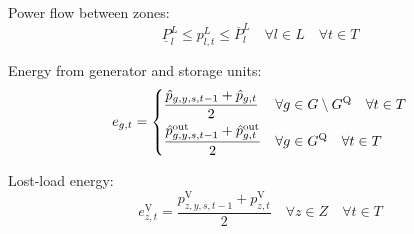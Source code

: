 \documentclass{article}
\newcommand{\sGenerators}{G}
\newcommand{\sGeneratorsExistingThermal}{G^{\mathrm{E,T}}}
\newcommand{\sGeneratorsCandidate}{G^{\mathrm{C}}}
\newcommand{\sGeneratorsThermal}{G^{\mathrm{T}}}
\newcommand{\sStorage}{G^{\mathrm{Q}}}
\newcommand{\sYears}{Y}
\newcommand{\sScenarios}{S}
\newcommand{\sIntervals}{T}
\newcommand{\sZones}{Z}
\newcommand{\sLinks}{L}
\newcommand{\iGenerator}{g}
\newcommand{\iYear}{y}
\newcommand{\iScenario}{s}
\newcommand{\iInterval}{t}
\newcommand{\iCalibrationInterval}{c}
\newcommand{\iZone}{z}
\newcommand{\iLink}{l}
\newcommand{\cScenarioDuration}[1][\iYear,\iScenario]{\rho_{#1}}
\newcommand{\cEmissionsIntensity}[1][\iGenerator]{E_{#1}}
\newcommand{\cPowerFlowMin}{\underline{P}_{\iLink}^{L}}
\newcommand{\cPowerFlowMax}{\overline{P}_{\iLink}^{L}}
\newcommand{\cEmmissionsCumulativeTarget}{\overline{E}}
\newcommand{\cSchemeRevenueCumulativeTarget}{\overline{R}}
\newcommand{\vBaseline}[1][\iCalibrationInterval]{\phi_{#1}}
\newcommand{\vPermitPrice}[1][\iCalibrationInterval]{\tau_{#1}}
\newcommand{\vEnergy}[1][\iGenerator,\iInterval]{e_{#1}}
\newcommand{\vPowerTotal}[1][\iGenerator,\iInterval]{\hat{p}_{#1}}
\newcommand{\vPowerTotalOut}[1][\iGenerator,\iInterval]{\hat{p}^{\mathrm{out}}_{#1}}
\newcommand{\vPowerFlow}[1][\iLink,\iInterval]{p^{\sLinks}_{#1}}
\newcommand{\vLostLoadEnergy}[1][\iZone,\iInterval]{e^{\mathrm{V}}_{#1}}
\newcommand{\vLostLoadPower}[1][\iZone,\iInterval]{p^{\mathrm{V}}_{#1}}
\newcommand{\vEmissionsTargetViolation}{f^{\mathrm{E}}}
\begin{document}
Power flow between zones:
\begin{equation}
\cPowerFlowMin \leq \vPowerFlow \leq \cPowerFlowMax \quad \forall \iLink \in \sLinks  \quad \forall \iInterval \in \sIntervals
\label{eqn: powerflow constraints}
\end{equation}

Energy from generator and storage units:
\begin{equation}
\vEnergy = \begin{dcases}
\frac{\vPowerTotal[\iGenerator, \iYear,\iScenario,\iInterval-1] + \vPowerTotal}{2} & \forall \iGenerator \in \sGenerators \setminus \sStorage  \quad \forall \iInterval \in \sIntervals\\
\frac{\vPowerTotalOut[\iGenerator, \iYear,\iScenario,\iInterval-1] + \vPowerTotalOut}{2} & \forall \iGenerator \in \sStorage  \quad \forall \iInterval \in \sIntervals\\
\end{dcases}
\end{equation}

Lost-load energy:
\begin{equation}
\vLostLoadEnergy = \frac{\vLostLoadPower[\iZone, \iYear,\iScenario,\iInterval-1] + \vLostLoadPower}{2} \quad \forall \iZone \in \sZones  \quad \forall \iInterval \in \sIntervals
\label{eqn: lost-load energy constraint}
\end{equation}

%
%
%

%
\end{document}
